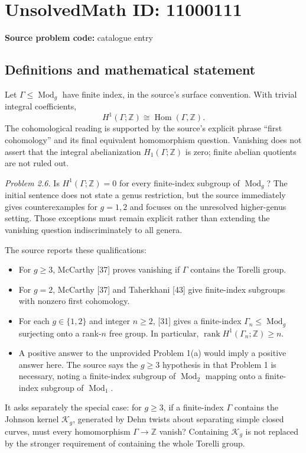 \documentclass[11pt]{article}
\newcommand{\Z}{\mathbb{Z}}
\begin{document}
\section*{UnsolvedMath ID: 11000111}
\textbf{Source problem code:} catalogue entry
\subsection{Definitions and mathematical statement}
Let \(\Gamma\leq\operatorname{Mod}_g\) have finite index, in the source's surface convention. With trivial integral coefficients,
\[
 H^1(\Gamma;\Z)\cong\operatorname{Hom}(\Gamma,\Z).
\]
The cohomological reading is supported by the source's explicit phrase ``first cohomology'' and its final equivalent homomorphism question. Vanishing does not assert that the integral abelianization \(H_1(\Gamma;\Z)\) is zero; finite abelian quotients are not ruled out.

\emph{Problem 2.6.} Is \(H^1(\Gamma;\Z)=0\) for every finite-index subgroup of \(\operatorname{Mod}_g\)? The initial sentence does not state a genus restriction, but the source immediately gives counterexamples for \(g=1,2\) and focuses on the unresolved higher-genus setting. Those exceptions must remain explicit rather than extending the vanishing question indiscriminately to all genera.

The source reports these qualifications:
\begin{itemize}
\item For \(g\geq3\), McCarthy [37] proves vanishing if \(\Gamma\) contains the Torelli group.
\item For \(g=2\), McCarthy [37] and Taherkhani [43] give finite-index subgroups with nonzero first cohomology.
\item For each \(g\in\{1,2\}\) and integer \(n\geq2\), [31] gives a finite-index \(\Gamma_n\leq\operatorname{Mod}_g\) surjecting onto a rank-\(n\) free group. In particular, \(\operatorname{rank}H^1(\Gamma_n;\Z)\geq n\).
\item A positive answer to the unprovided Problem 1(a) would imply a positive answer here. The source says the \(g\geq3\) hypothesis in that Problem 1 is necessary, noting a finite-index subgroup of \(\operatorname{Mod}_2\) mapping onto a finite-index subgroup of \(\operatorname{Mod}_1\).
\end{itemize}
It asks separately the special case: for \(g\geq3\), if a finite-index \(\Gamma\) contains the Johnson kernel \(\mathcal K_g\), generated by Dehn twists about separating simple closed curves, must every homomorphism \(\Gamma\to\Z\) vanish? Containing \(\mathcal K_g\) is not replaced by the stronger requirement of containing the whole Torelli group.
\end{document}
